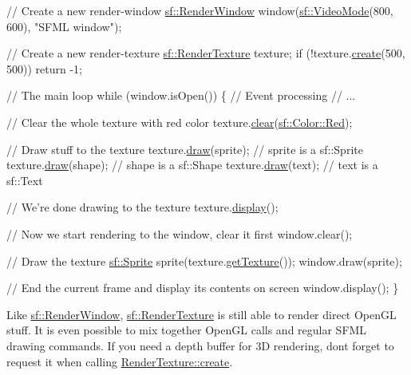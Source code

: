 \begin{DoxyCode}
\textcolor{comment}{// Create a new render-window}
\hyperlink{classsf_1_1_render_window}{sf::RenderWindow} window(\hyperlink{classsf_1_1_video_mode}{sf::VideoMode}(800, 600), \textcolor{stringliteral}{"SFML window"});

\textcolor{comment}{// Create a new render-texture}
\hyperlink{classsf_1_1_render_texture}{sf::RenderTexture} texture;
\textcolor{keywordflow}{if} (!texture.\hyperlink{classsf_1_1_render_texture_aefbb76eb3b87e368ab974b2660931ccb}{create}(500, 500))
    \textcolor{keywordflow}{return} -1;

\textcolor{comment}{// The main loop}
\textcolor{keywordflow}{while} (window.isOpen())
\{
   \textcolor{comment}{// Event processing}
   \textcolor{comment}{// ...}

   \textcolor{comment}{// Clear the whole texture with red color}
   texture.\hyperlink{classsf_1_1_render_target_a6bb6f0ba348f2b1e2f46114aeaf60f26}{clear}(\hyperlink{classsf_1_1_color_a127dbf55db9c07d0fa8f4bfcbb97594a}{sf::Color::Red});

   \textcolor{comment}{// Draw stuff to the texture}
   texture.\hyperlink{classsf_1_1_render_target_a12417a3bcc245c41d957b29583556f39}{draw}(sprite);  \textcolor{comment}{// sprite is a sf::Sprite}
   texture.\hyperlink{classsf_1_1_render_target_a12417a3bcc245c41d957b29583556f39}{draw}(shape);   \textcolor{comment}{// shape is a sf::Shape}
   texture.\hyperlink{classsf_1_1_render_target_a12417a3bcc245c41d957b29583556f39}{draw}(text);    \textcolor{comment}{// text is a sf::Text}

   \textcolor{comment}{// We're done drawing to the texture}
   texture.\hyperlink{classsf_1_1_render_texture_af92886d5faef3916caff9fa9ab32c555}{display}();

   \textcolor{comment}{// Now we start rendering to the window, clear it first}
   window.clear();

   \textcolor{comment}{// Draw the texture}
   \hyperlink{classsf_1_1_sprite}{sf::Sprite} sprite(texture.\hyperlink{classsf_1_1_render_texture_a07ecea85f05932fa02a8279416721bc9}{getTexture}());
   window.draw(sprite);

   \textcolor{comment}{// End the current frame and display its contents on screen}
   window.display();
\}
\end{DoxyCode}


Like \hyperlink{classsf_1_1_render_window}{sf\+::\+Render\+Window}, \hyperlink{classsf_1_1_render_texture}{sf\+::\+Render\+Texture} is still able to render direct Open\+GL stuff. It is even possible to mix together Open\+GL calls and regular S\+F\+ML drawing commands. If you need a depth buffer for 3D rendering, don\textquotesingle{}t forget to request it when calling \hyperlink{classsf_1_1_render_texture_aefbb76eb3b87e368ab974b2660931ccb}{Render\+Texture\+::create}.

